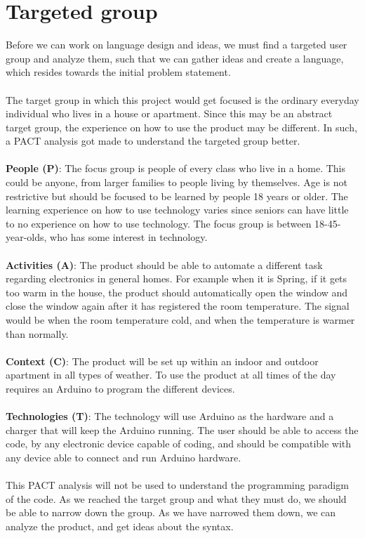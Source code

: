 \section{Targeted group}
\label{targetedGroup}
Before we can work on language design and ideas, we must find a targeted user group and analyze them, such that we can gather ideas and create a language, which resides towards the initial problem statement. \\
\\
The target group in which this project would get focused is the ordinary everyday individual who lives in a house or apartment. Since this may be an abstract target group, the experience on how to use the product may be different. In such, a PACT analysis got made to understand the targeted group better. \\
\\
\textbf{People (P)}: The focus group is people of every class who live in a home. This could be anyone, from larger families to people living by themselves. Age is not restrictive but should be focused to be learned by people 18 years or older. The learning experience on how to use technology varies since seniors can have little to no experience on how to use technology. The focus group is between 18-45-year-olds, who has some interest in technology.\\
\\
\textbf{Activities (A)}: The product should be able to automate a different task regarding electronics in general homes. For example when it is Spring, if it gets too warm in the house, the product should automatically open the window and close the window again after it has registered the room temperature. The signal would be when the room temperature cold, and when the temperature is warmer than normally. \\
\\
\textbf{Context (C)}: The product will be set up within an indoor and outdoor apartment in all types of weather. To use the product at all times of the day requires an Arduino to program the different devices.\\
\\
\textbf{Technologies (T)}: The technology will use Arduino as the hardware and a charger that will keep the Arduino running. The user should be able to access the code, by any electronic device capable of coding, and should be compatible with any device able to connect and run Arduino hardware. \\
\\
This PACT analysis will not be used to understand the programming paradigm of the code. As we reached the target group and what they must do, we should be able to narrow down the group. As we have narrowed them down, we can analyze the product, and get ideas about the syntax.